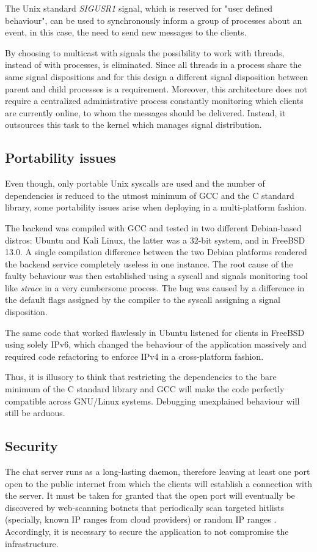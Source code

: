 The Unix standard \textit{SIGUSR1} signal, which is reserved for "user defined behaviour", can be used to synchronously inform a group of processes about an event, in this case, the need to send new messages to the clients.

By choosing to multicast with signals the possibility to work with threads, instead of with processes, is eliminated. Since all threads in a process share the same signal dispositions and for this design a different signal disposition between parent and child processes is a requirement. Moreover, this architecture does not require a centralized administrative process constantly monitoring which clients are currently online, to whom the messages should be delivered. Instead, it outsources this task to the kernel which manages signal distribution.


\subsection{Portability issues}
Even though, only portable Unix syscalls are used and the number of dependencies is reduced to the utmost minimum of GCC and the C standard library, some portability issues arise when deploying in a multi-platform fashion.

The backend was compiled with GCC and tested in two different Debian-based distros: Ubuntu and Kali Linux, the latter was a 32-bit system, and in FreeBSD 13.0. A single compilation difference between the two Debian platforms rendered the backend service completely useless in one instance. The root cause of the faulty behaviour was then established using a syscall and signals monitoring tool like \textit{strace} in a very cumbersome process. The bug was caused by a difference in the default flags assigned by the compiler to the syscall assigning a signal disposition.

The same code that worked flawlessly in Ubuntu listened for clients in FreeBSD using solely IPv6, which changed the behaviour of the application massively and required code refactoring to enforce IPv4 in a cross-platform fashion.

Thus, it is illusory to think that restricting the dependencies to the bare minimum of the C standard library and GCC will make the code perfectly compatible across GNU/Linux systems. Debugging unexplained behaviour will still be arduous.

\subsection{Security}
The chat server runs as a long-lasting daemon, therefore leaving at least one port open to the public internet from which the clients will establish a connection with the server. It must be taken for granted that the open port will eventually be discovered by web-scanning botnets that periodically scan targeted hitlists (specially, known IP ranges from cloud providers) or random IP ranges \cite{Mirkovic2004}. Accordingly, it is necessary to secure the application to not compromise the infrastructure.

